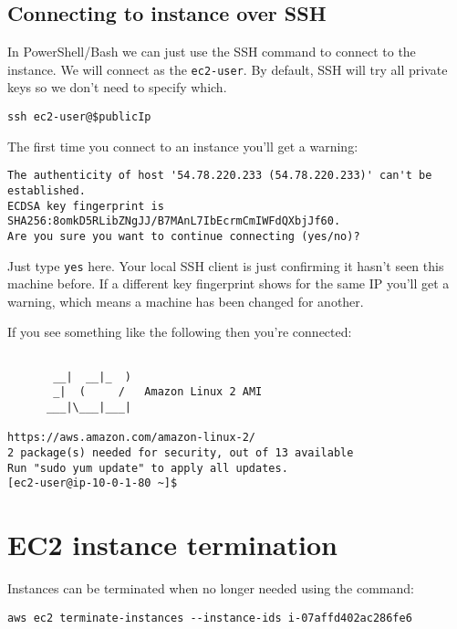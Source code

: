 \documentclass{pgnotes}
\begin{document}
\subsection{Connecting to instance over SSH}
\label{sec:connecting-to-instance-over-ssh}

In PowerShell/Bash we can just use the SSH command to connect to the instance.
We will connect as the \texttt{ec2-user}.
By default, SSH will try all private keys so we don't need to specify which.

\begin{verbatim}
ssh ec2-user@$publicIp 
\end{verbatim}

The first time you connect to an instance you'll get a warning:

\begin{verbatim}
The authenticity of host '54.78.220.233 (54.78.220.233)' can't be established.
ECDSA key fingerprint is SHA256:8omkD5RLibZNgJJ/B7MAnL7IbEcrmCmIWFdQXbjJf60.
Are you sure you want to continue connecting (yes/no)?
\end{verbatim}

Just type \texttt{yes} here.
Your local SSH client is just confirming it hasn't seen this machine before.
If a different key fingerprint shows for the same IP you'll get a warning, which means a machine has been changed for another.

If you see something like the following then you're connected:

\begin{verbatim}

       __|  __|_  )
       _|  (     /   Amazon Linux 2 AMI
      ___|\___|___|

https://aws.amazon.com/amazon-linux-2/
2 package(s) needed for security, out of 13 available
Run "sudo yum update" to apply all updates.
[ec2-user@ip-10-0-1-80 ~]$ 
\end{verbatim}

\section{EC2 instance termination}

Instances can be terminated when no longer needed using the command: 

\begin{verbatim}
aws ec2 terminate-instances --instance-ids i-07affd402ac286fe6
\end{verbatim}
\end{document}
